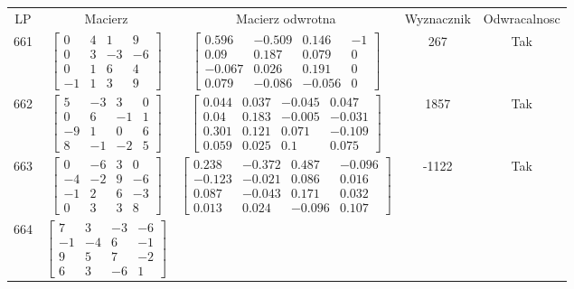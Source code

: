 \documentclass[a4paper,12pt]{article}
\begin{document}
\bgroup {} \vspace{0.2in} \begin{tabular}{c c c c c}
LP & Macierz & Macierz odwrotna & Wyznacznik & Odwracalnosc\\
661
&
$\begin{bmatrix} 0 & 4 & 1 & 9 \\ 0 & 3 & -3 & -6 \\ 0 & 1 & 6 & 4 \\ -1 & 1 & 3 & 9 \end{bmatrix}$
&
$\begin{bmatrix} 0.596 & -0.509 & 0.146 & -1 \\ 0.09 & 0.187 & 0.079 & 0 \\ -0.067 & 0.026 & 0.191 & 0 \\ 0.079 & -0.086 & -0.056 & 0 \end{bmatrix}$
&
267
&
Tak
\\
662
&
$\begin{bmatrix} 5 & -3 & 3 & 0 \\ 0 & 6 & -1 & 1 \\ -9 & 1 & 0 & 6 \\ 8 & -1 & -2 & 5 \end{bmatrix}$
&
$\begin{bmatrix} 0.044 & 0.037 & -0.045 & 0.047 \\ 0.04 & 0.183 & -0.005 & -0.031 \\ 0.301 & 0.121 & 0.071 & -0.109 \\ 0.059 & 0.025 & 0.1 & 0.075 \end{bmatrix}$
&
1857
&
Tak
\\
663
&
$\begin{bmatrix} 0 & -6 & 3 & 0 \\ -4 & -2 & 9 & -6 \\ -1 & 2 & 6 & -3 \\ 0 & 3 & 3 & 8 \end{bmatrix}$
&
$\begin{bmatrix} 0.238 & -0.372 & 0.487 & -0.096 \\ -0.123 & -0.021 & 0.086 & 0.016 \\ 0.087 & -0.043 & 0.171 & 0.032 \\ 0.013 & 0.024 & -0.096 & 0.107 \end{bmatrix}$
&
-1122
&
Tak
\\
664
&
$\begin{bmatrix} 7 & 3 & -3 & -6 \\ -1 & -4 & 6 & -1 \\ 9 & 5 & 7 & -2 \\ 6 & 3 & -6 & 1 \end{bmatrix}$

\end{tabular}
\end{document}
